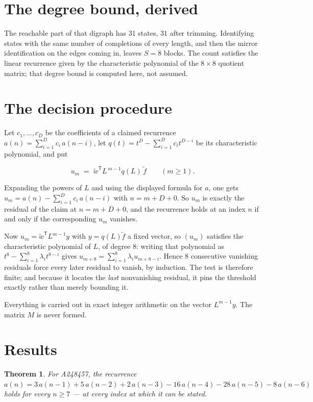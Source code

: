 \documentclass[11pt]{article}
\newtheorem{theorem}{Theorem}
\theoremstyle{definition}
\begin{document}
\section{The degree bound, derived}

The reachable part of that digraph has $31$ states, $31$ after trimming. Identifying states with the same number of completions of every length, and then the mirror identification on the edges coming in, leaves $S = 8$ blocks. The count satisfies the linear recurrence given by the characteristic polynomial of the $8\times8$ quotient matrix; that degree bound is computed here, not assumed.

\section{The decision procedure}

Let $c_1,\dots,c_D$ be the coefficients of a claimed recurrence $a(n) = \sum_{i=1}^{D} c_i\,a(n-i)$, let $q(t) = t^{D} - \sum_{i=1}^{D} c_i t^{D-i}$ be its characteristic polynomial, and put

\[u_m \;=\; \tilde w^{\mathsf T} L^{\,m-1} q(L)\,\tilde f \qquad (m \ge 1).\]

Expanding the powers of $L$ and using the displayed formula for $a$, one gets $u_m = a(n) - \sum_{i=1}^{D} c_i\,a(n-i)$ with $n = m + D + 0$. So $u_m$ is exactly the residual of the claim at $n = m + D + 0$, and the recurrence holds at an index $n$ if and only if the corresponding $u_m$ vanishes.

Now $u_m = \tilde w^{\mathsf T} L^{m-1} y$ with $y = q(L)\tilde f$ a fixed vector, so $(u_m)$ satisfies the characteristic polynomial of $L$, of degree $8$: writing that polynomial as $t^{8} - \sum_{i=1}^{8} \lambda_i t^{8-i}$ gives $u_{m+8} = \sum_{i=1}^{8} \lambda_i u_{m+8-i}$. Hence $8$ consecutive vanishing residuals force every later residual to vanish, by induction. The test is therefore finite; and because it locates the {\itshape last} nonvanishing residual, it pins the threshold exactly rather than merely bounding it.

Everything is carried out in exact integer arithmetic on the vector $L^{m-1}y$. The matrix $M$ is never formed.

\section{Results}

\begin{theorem} For A248457, the recurrence $a(n) = 3\,a(n-1) + 5\,a(n-2) + 2\,a(n-3) - 16\,a(n-4) - 28\,a(n-5) - 8\,a(n-6)$ holds for every $n \ge 7$ --- at every index at which it can be stated.\end{theorem}
\end{document}
